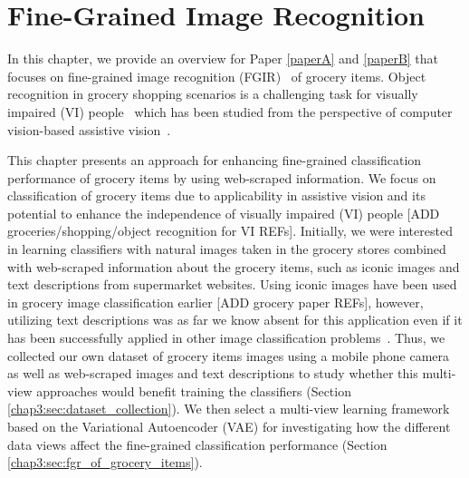 
\chapter{Fine-Grained Image Recognition}\label{chap3}

In this chapter, we provide an overview for Paper \ref{paperA} and \ref{paperB} that focuses on fine-grained image recognition (FGIR)~\cite{wei2021fine} of grocery items. 
Object recognition in grocery shopping scenarios is a challenging task for visually impaired (VI) people~\cite{brady2013visual,cimarolli2012challenges,szpiro2016finding} which has been studied from the perspective of computer vision-based assistive vision~\cite{lanigan2006trinetra,winlock2010toward,sosa2017hands,boldu2020aisee,zientara2017third,george2015fine}. 



This chapter presents an approach for enhancing fine-grained classification performance of grocery items by using web-scraped information. We focus on classification of grocery items due to applicability in assistive vision and its potential to enhance the independence of visually impaired (VI) people [ADD groceries/shopping/object recognition for VI REFs]. Initially, we were interested in learning classifiers with natural images taken in the grocery stores combined with web-scraped information about the grocery items, such as iconic images and text descriptions from supermarket websites. Using iconic images have been used in grocery image classification earlier [ADD grocery paper REFs], however, utilizing text descriptions was as far we know absent for this application even if it has been successfully applied in other image classification problems~\cite{wah2011cub, nilsback2008automated, bujwid2021large}. Thus, we collected our own dataset of grocery items images using a mobile phone camera as well as web-scraped images and text descriptions to study whether this multi-view approaches would benefit training the classifiers (Section \ref{chap3:sec:dataset_collection}). We then select a multi-view learning framework based on the Variational Autoencoder (VAE) for investigating how the different data views affect the fine-grained classification performance (Section \ref{chap3:sec:fgr_of_grocery_items}). 


